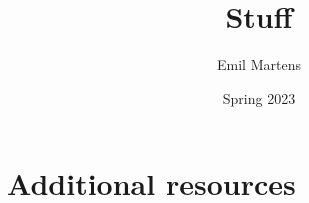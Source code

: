 \documentclass[british,titlepage,oneside]{ntnuthesis}
\title{Stuff}
\author{Emil Martens}
\date{Spring 2023}
\begin{document}
\tableofcontents
\pagebreak

% 
% 
% 
% 
% 
% 

\chapter*{\bibname}

\AtNextBibliography{\footnotesize}
\printbibliography

\chapter{Additional resources}



% 
\end{document}
